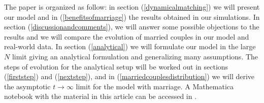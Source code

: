 \documentclass[12pt]{article}
\begin{document}


The paper is organized as follow: in section (\ref{dynamicalmatching}) we will present our model and in (\ref{benefitsofmarriage}) the results obtained in our simulations. In section (\ref{discussionandcomments}), we will answer some possible objections to the results and we will compare the evolution of married couples in our model and real-world data. In section (\ref{analytical}) we will formulate our model in the large $N$ limit giving an analytical formulation and generalizing many assumptions.
The steps of evolution for the analytical setup will be worked out in sections (\ref{firststep}) and (\ref{nextstep}), and in (\ref{marriedcouplesdistribution}) we will derive the asymptotic $t\rightarrow\infty$ limit for the model with marriage. 
A Mathematica notebook with the material in this article can be accessed in \cite{notebook}.




\end{document}
